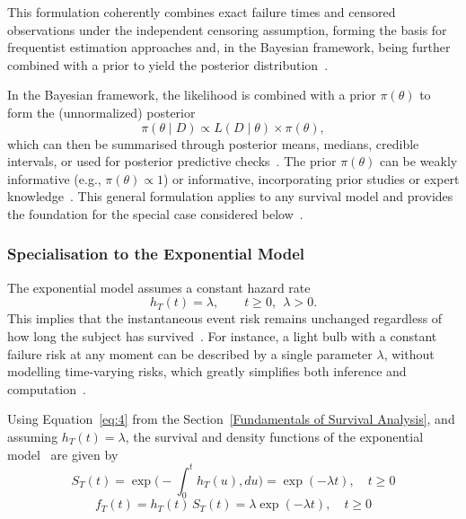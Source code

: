 This formulation coherently combines exact failure times and censored observations under the independent censoring assumption, forming the basis for frequentist estimation approaches and, in the Bayesian framework, being further combined with a prior to yield the posterior distribution~\cite{kalbfleisch2002statistical}.

In the Bayesian framework, the likelihood is combined with a prior $\pi(\theta)$ to form the (unnormalized) posterior
\begin{equation}
\pi(\theta \mid D)
\propto
L(D \mid \theta)\times \pi(\theta),
\end{equation}
which can then be summarised through posterior means, medians, credible intervals, or used for posterior predictive checks~\cite{ibrahim2013bayesian}. The prior $\pi(\theta)$ can be weakly informative (e.g., $\pi(\theta) \propto 1$) or informative, incorporating prior studies or expert knowledge~\cite{carlin1997bayes}. This general formulation applies to any survival model and provides the foundation for the special case considered below~\cite{bernardo1994bayesian}.

\subsubsection{Specialisation to the Exponential Model}
\label{指数模型贝叶斯推断过程}
The exponential model assumes a constant hazard rate
\begin{equation}
h_T(t)=\lambda,\qquad t\ge 0,\ \ \lambda>0 .
\end{equation}
This implies that the instantaneous event risk remains unchanged regardless of how long the subject has survived~\cite{lawless2011statistical, ibrahim2013bayesian}. For instance, a light bulb with a constant failure risk at any moment can be described by a single parameter $\lambda$, without modelling time-varying risks, which greatly simplifies both inference and computation~\cite{lawless2011statistical}.

Using Equation~\eqref{eq:4} from the Section~\ref{Fundamentals of Survival Analysis}, and assuming $h_T(t) = \lambda$, the survival and density functions of the exponential model~\cite{kleinbaum1996survival} are given by
\begin{equation}
    S_T(t) = \exp\Big( -\displaystyle\int_0^t h_T(u), du \Big)=\exp(-\lambda t), \quad t \ge 0
    \label{St_exp}
\end{equation}
\begin{equation}
    f_T(t) = h_T(t)\, S_T(t)=\lambda \exp(-\lambda t), \quad t \ge 0
    \label{ft_exp}
\end{equation}

